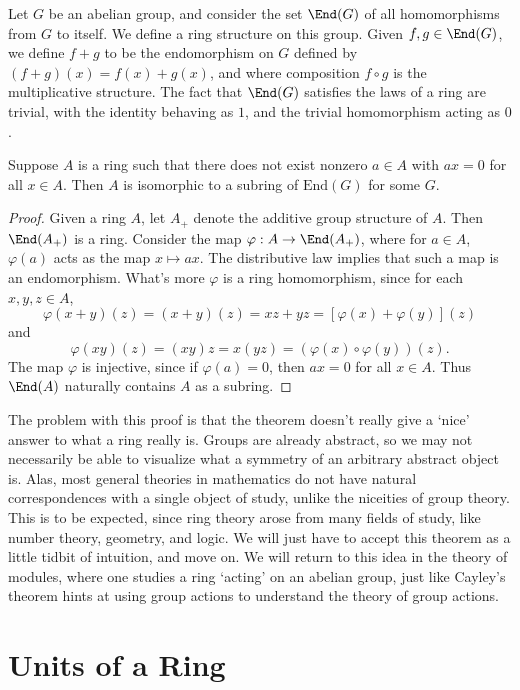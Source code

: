\begin{example}
    Let $G$ be an abelian group, and consider the set $\End(G)$ of all homomorphisms from $G$ to itself. We define a ring structure on this group. Given $f,g \in \End(G)$, we define $f+g$ to be the endomorphism on $G$ defined by $(f + g)(x) = f(x) + g(x)$, and where composition $f \circ g$ is the multiplicative structure. The fact that $\End(G)$ satisfies the laws of a ring are trivial, with the identity behaving as $1$, and the trivial homomorphism acting as $0$.
\end{example}

\begin{theorem}
    Suppose $A$ is a ring such that there does not exist nonzero $a \in A$ with $ax = 0$ for all $x \in A$. Then $A$ is isomorphic to a subring of $\text{End}(G)$ for some $G$.
\end{theorem}
\begin{proof}
    Given a ring $A$, let $A_+$ denote the additive group structure of $A$. Then $\End(A_+)$ is a ring. Consider the map $\varphi: A \to \End(A_+)$, where for $a \in A$, $\varphi(a)$ acts as the map $x \mapsto ax$. The distributive law implies that such a map is an endomorphism. What's more $\varphi$ is a ring homomorphism, since for each $x,y,z \in A$,
    \[ \varphi(x + y)(z) = (x + y)(z) = xz + yz = [\varphi(x) + \varphi(y)](z) \]
    and
    \[ \varphi(xy)(z) = (xy)z = x(yz) = (\varphi(x) \circ \varphi(y))(z). \]
    The map $\varphi$ is injective, since if $\varphi(a) = 0$, then $ax = 0$ for all $x \in A$. Thus $\End(A)$ naturally contains $A$ as a subring.
\end{proof}

The problem with this proof is that the theorem doesn't really give a `nice' answer to what a ring really is. Groups are already abstract, so we may not necessarily be able to visualize what a symmetry of an arbitrary abstract object is. Alas, most general theories in mathematics do not have natural correspondences with a single object of study, unlike the niceities of group theory. This is to be expected, since ring theory arose from many fields of study, like number theory, geometry, and logic. We will just have to accept this theorem as a little tidbit of intuition, and move on. We will return to this idea in the theory of modules, where one studies a ring `acting' on an abelian group, just like Cayley's theorem hints at using group actions to understand the theory of group actions.

\section{Units of a Ring}

